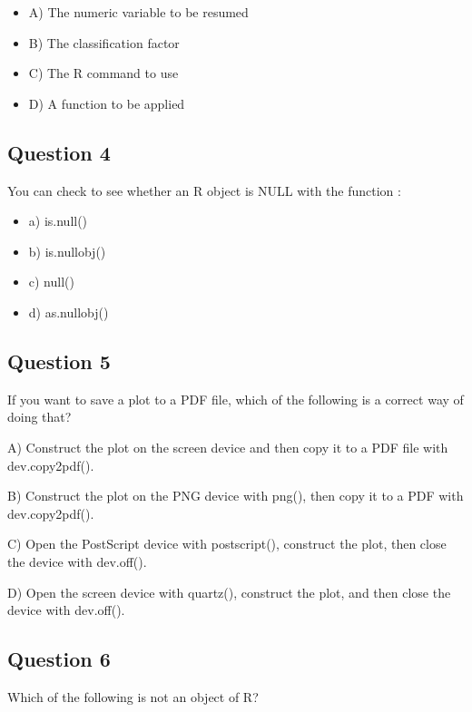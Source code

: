 \documentclass[11pt]{article}
\begin{document}
\begin{itemize}
\item A) The numeric variable to be resumed

\item B) The classification factor

\item C) The R command to use

\item D) A function to be applied
\end{itemize}

\subsection*{Question 4}
\label{sec:org9a90e19}
You can check to see whether an R object is NULL with the function :

\begin{itemize}
\item a) is.null()

\item b) is.nullobj()

\item c) null()

\item d) as.nullobj()
\end{itemize}

\subsection*{Question 5}
\label{sec:org962af81}
If you want to save a plot to a PDF file, which of the following is a correct way of doing that?

A) Construct the plot on the screen device and then copy it to a PDF file with dev.copy2pdf().

B) Construct the plot on the PNG device with png(), then copy it to a PDF with dev.copy2pdf().

C) Open the PostScript device with postscript(), construct the plot, then close the device with dev.off().

D) Open the screen device with quartz(), construct the plot, and then close the
device with dev.off().

\subsection*{Question 6}
\label{sec:orgd5be9f0}
Which of the following is not an object of R?
\end{document}
